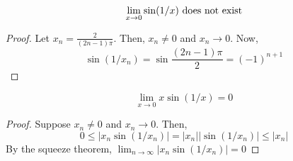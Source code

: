 \begin{theorem}
    \begin{equation*}
        \lim \limits_{x \to 0} \sin (1/x) \textnormal { does not exist}
    \end{equation*}
\end{theorem}

\begin{proof}
    Let $x_n = \frac{2}{(2n-1)\pi}$. Then, $x_n \neq 0$ and $x_n \to 0$. Now,
    \begin{equation*}
        \sin (1/x_n) = \sin \frac{(2n-1) \pi}{2} = (-1)^{n+1}
    \end{equation*}
\end{proof}

\begin{theorem}
    \begin{equation*}
        \lim \limits_{x \to 0} x \sin(1/x) = 0
    \end{equation*}
\end{theorem}

\begin{proof}
    Suppose $x_n \neq 0$ and $x_n \to 0$. Then,
    \begin{equation*}
        0 \leq |x_n \sin(1/x_n)| = |x_n||\sin(1/x_n)| \leq |x_n|
    \end{equation*}
    By the squeeze theorem, $\lim _{n \to \infty} |x_n \sin(1/x_n)| = 0$
\end{proof}